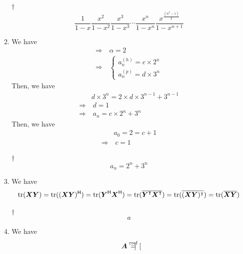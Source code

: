 \documentclass[a4paper,12pt]{article}
\begin{document}
\begin{enumerate}
\begin{answer}{$\dag$}
\begin{equation}
		\frac{1}{1 - x}\frac{x^2}{1 - x^2}\frac{x^3}{1 - x^3}\cdots\frac{x^n}{1 - x^n}\frac{x^{\frac{(n^2 - 1)}{2}}}{1 - x^{n + 1}}
		\end{equation}
	\end{answer}
	\item We have \begin{equation}
		\begin{aligned}
			\Rightarrow & \ \alpha = 2 \\
			\Rightarrow & \ \begin{cases}
				a_n^{(h)} = c \times 2^n \\
				a_n^{(p)} = d \times 3^n
			\end{cases}
		\end{aligned}
	\end{equation} Then, we have \begin{equation}
		\begin{aligned}
			& d \times 3^n = 2 \times d \times 3^{n - 1} + 3^{n - 1} \\
			\Rightarrow & \ d = 1 \\
			\Rightarrow & \ a_n = c \times 2^n + 3^n
		\end{aligned}
	\end{equation} Then, we have \begin{equation}
		\begin{aligned}
			& a_0 = 2 = c + 1 \\
			\Rightarrow & \ c = 1
		\end{aligned}
	\end{equation}
	\begin{answer}{$\dag$}\begin{equation}
			a_n = 2^n + 3^n
		\end{equation}
	\end{answer}
	\item We have \begin{equation}
		\operatorname{tr}(\boldsymbol{XY}) = \operatorname{tr}((\boldsymbol{XY})^{\mathsf{H}}) = \operatorname{tr}(\boldsymbol{Y}^{\mathsf{H}}\boldsymbol{X}^{\mathsf{H}}) = \operatorname{tr}(\overline{\boldsymbol{Y}^\intercal\boldsymbol{X}^\intercal}) = \operatorname{tr}(\overline{(\boldsymbol{XY})^\intercal}) = \operatorname{tr}(\overline{\boldsymbol{XY}})
	\end{equation}
	\begin{answer}{$\dag$}\begin{equation}
			a
		\end{equation}
	\end{answer}
	\item We have \begin{equation}
		\boldsymbol{A} \overset{\text{rref}}= \begin{bmatrix}

\end{bmatrix}
\end{equation}
\end{enumerate}
\end{document}
